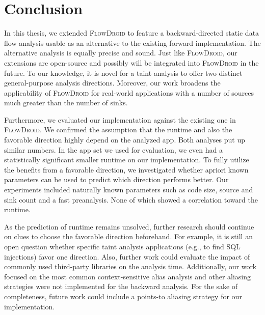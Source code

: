 \documentclass[../draft.tex]{subfiles}
\begin{document}
    \chapter{Conclusion}
    In this thesis, we extended \textsc{FlowDroid} to feature a backward-directed static data flow analysis usable as an alternative to the existing forward implementation.
    The alternative analysis is equally precise and sound.
    Just like \textsc{FlowDroid}, our extensions are open-source and possibly will be integrated into \textsc{FlowDroid} in the future.
    To our knowledge, it is novel for a taint analysis to offer two distinct general-purpose analysis directions.
    Moreover, our work broadens the applicability of \textsc{FlowDroid} for real-world applications with a number of sources much greater than the number of sinks.

    Furthermore, we evaluated our implementation against the existing one in \textsc{FlowDroid}.
    We confirmed the assumption that the runtime and also the favorable direction highly depend on the analyzed app.
    Both analyses put up similar numbers.
    In the app set we used for evaluation, we even had a statistically significant smaller runtime on our implementation.
    To fully utilize the benefits from a favorable direction, we investigated whether apriori known parameters can be used to predict which direction performs better.
    Our experiments included naturally known parameters such as code size, source and sink count and a fast preanalysis.
    None of which showed a correlation toward the runtime.

    As the prediction of runtime remains unsolved, further research should continue on clues to choose the favorable direction beforehand.
    For example, it is still an open question whether specific taint analysis applications (e.g., to find SQL injections) favor one direction.
    Also, further work could evaluate the impact of commonly used third-party libraries on the analysis time.
    Additionally, our work focused on the most common context-sensitive alias analysis and other aliasing strategies were not implemented for the backward analysis. 
    For the sake of completeness, future work could include a points-to aliasing strategy for our implementation.
\end{document}
